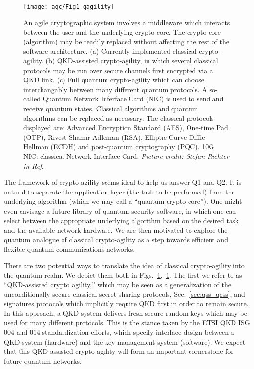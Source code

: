 \begin{figure}[htp]
\captionsetup{width=\linewidth}
\centering
\texttt{[image: aqc/Fig1-qagility]}
\caption{\label{fig:agility} An agile cryptographic system involves a middleware which interacts between the user and the underlying crypto-core. The crypto-core (algorithm) may be readily replaced without affecting the rest of the software architecture. (a) Currently implemented classical crypto-agility. (b) QKD-assisted crypto-agility, in which several classical protocols may be run over secure channels first encrypted via a QKD link. (c) Full quantum crypto-agility which can choose interchangably between many different quantum protocols. A so-called Quantum Network Inferface Card (NIC) is used to send and receive quantum states. Classical algorithms and quantum algorithms can be replaced as necessary. The classical protocols displayed are: Advanced Encryption Standard (AES), One-time Pad (OTP), Rivest-Shamir-Adleman (RSA), Elliptic-Curve Diffie-Hellman (ECDH) and post-quantum cryptography (PQC). 10G NIC: classical Network Interface Card. \emph{Picture credit: Stefan Richter in Ref.~\cite{Richter2020}}}
\end{figure}


The framework of crypto-agility seems ideal to help us answer Q1 and Q2. It is natural to separate the application layer (the task to be performed) from the underlying algorithm (which we may call a ``quantum crypto-core''). One might even envisage a future library of quantum security software, in which one can select between the appropriate underlying algorithm based on the desired task and the available network hardware. We are then motivated to explore the quantum analogue of classical crypto-agility as a step towards efficient and flexible quantum communications networks.



There are two potential ways to translate the idea of classical crypto-agility into the quantum realm. We depict them both in Figs.~\ref{fig:agility},~\ref{fig:agility}. The first we refer to as ``QKD-assisted crypto agility,'' which may be seen as a generalization of the unconditionally secure classical secret sharing protocols, Sec.~\ref{sec:qss_qcss}, and signatures protocols \cite{Wallden2015, Amiri2016a} which implicitly require QKD first in order to remain secure. In this approach, a QKD system delivers fresh secure random keys which may be used for many different protocols. This is the stance taken by the ETSI QKD ISG $004$ \cite{ETSI004} and $014$ \cite{ETSI014} standardization efforts, which specify interface design between a QKD system (hardware) and the key management system (software). We expect that this QKD-assisted crypto agility will form an important cornerstone for future quantum networks. %

